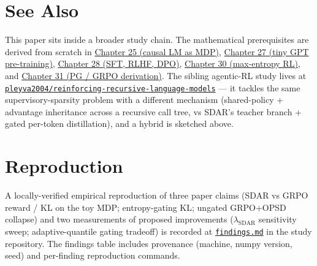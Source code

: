 \documentclass[11pt]{article}
\begin{document}
\section*{See Also}

This paper sits inside a broader study chain. The mathematical
prerequisites are derived from scratch in
\href{https://github.com/pleyva2004/first-principles-to-llms/blob/main/chapters/ch25/README.md}{Chapter 25 (causal LM as MDP)},
\href{https://github.com/pleyva2004/first-principles-to-llms/blob/main/chapters/ch27/README.md}{Chapter 27 (tiny GPT pre-training)},
\href{https://github.com/pleyva2004/first-principles-to-llms/blob/main/chapters/ch28/README.md}{Chapter 28 (SFT, RLHF, DPO)},
\href{https://github.com/pleyva2004/first-principles-to-llms/blob/main/chapters/ch30/README.md}{Chapter 30 (max-entropy RL)},
and
\href{https://github.com/pleyva2004/first-principles-to-llms/blob/main/chapters/ch31/README.md}{Chapter 31 (PG / GRPO derivation)}.
The sibling agentic-RL study lives at
\href{https://github.com/pleyva2004/reinforcing-recursive-language-models}{\texttt{pleyva2004/reinforcing-recursive-language-models}}
--- it tackles the same supervisory-sparsity problem with a different
mechanism (shared-policy + advantage inheritance across a recursive call
tree, vs SDAR's teacher branch + gated per-token distillation), and a
hybrid is sketched above.

\section*{Reproduction}

A locally-verified empirical reproduction of three paper claims (SDAR vs GRPO reward / KL on the toy MDP; entropy-gating KL; ungated GRPO+OPSD collapse) and two measurements of proposed improvements ($\lambda_{\mathrm{SDAR}}$ sensitivity sweep; adaptive-quantile gating tradeoff) is recorded at
\href{https://github.com/pleyva2004/self-distilled-agentic-reinforcement-learning/blob/main/findings.md}{\texttt{findings.md}}
in the study repository. The findings table includes provenance (machine, numpy version, seed) and per-finding reproduction commands.



\end{document}
